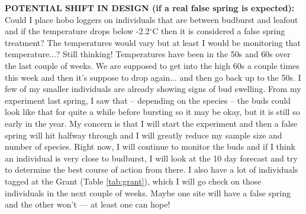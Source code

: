 \documentclass{article}\usepackage[]{graphicx}\usepackage[]{color}
\begin{document}
\textbf{POTENTIAL SHIFT IN DESIGN (if a real false spring is expected): } Could I place hobo loggers on individuals that are between budburst and leafout and if the temperature drops below -2.2$^{\circ}$C then it is considered a false spring treatment? The temperatures would vary but at least I would be monitoring that temperature...? Still thinking! Temperatures have been in the 50s and 60s over the last couple of weeks. We are supposed to get into the high 60s a couple times this week and then it's suppose to drop again... and then go back up to the 50s. I few of my smaller individuals are already showing signs of bud swelling. From my experiment last spring, I saw that -- depending on the species -- the buds could look like that for quite a while before bursting so it may be okay, but it is still so early in the year. My concern is that I will start the experiment and then a false spring will hit halfway through and I will greatly reduce my sample size and number of species. Right now, I will continue to monitor the buds and if I think an individual is very close to budburst, I will look at the 10 day forecast and try to determine the best course of action from there. I also have a lot of individuals tagged at the Grant (Table \ref{tab:grant}), which I will go check on those individuals in the next couple of weeks. Maybe one site will have a false spring and the other won't --- at least one can hope!
\end{document}
